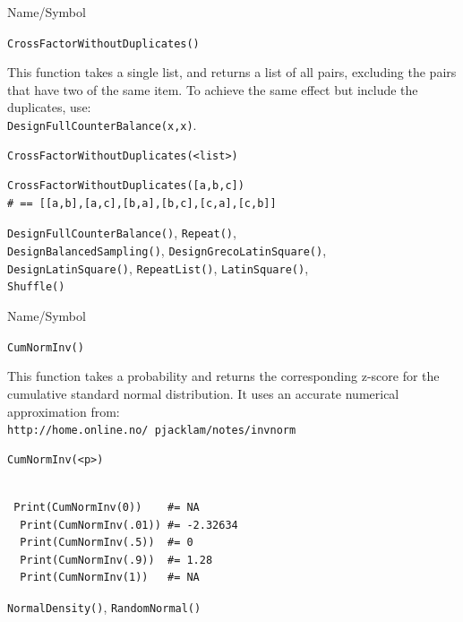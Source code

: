 \begin{desc}{Name/Symbol}
\item[Name/Symbol]  	\verb+CrossFactorWithoutDuplicates()+

\item[Description] 	This function takes a single list, and returns a list of all 
			pairs, excluding the pairs that have two of the same item. 
			To achieve the same effect but include the duplicates, use: \\
			\verb+DesignFullCounterBalance(x,x)+.

\item[Usage]
\begin{verbatim}
CrossFactorWithoutDuplicates(<list>)
\end{verbatim}

\item[Example]
\begin{verbatim}
CrossFactorWithoutDuplicates([a,b,c]) 
# == [[a,b],[a,c],[b,a],[b,c],[c,a],[c,b]]
\end{verbatim}

\item[See Also] \verb+DesignFullCounterBalance()+, \verb+Repeat()+,\\ \verb+DesignBalancedSampling()+,
 \verb+DesignGrecoLatinSquare()+,\\
  \verb+DesignLatinSquare()+,  \verb+RepeatList()+, 
  \verb+LatinSquare()+,\\ \verb+Shuffle()+
\end{desc}


\begin{desc}{Name/Symbol}
\item[Name/Symbol]  	\verb+CumNormInv()+

\item[Description] 	This function takes a probability and returns the 
  corresponding z-score for the cumulative standard normal distribution.
  It uses an accurate numerical approximation from:\\
  \texttt{http://home.online.no/~pjacklam/notes/invnorm}
\item[Usage]
\begin{verbatim}
CumNormInv(<p>)
\end{verbatim}

\item[Example]
\begin{verbatim}

 Print(CumNormInv(0))    #= NA
  Print(CumNormInv(.01)) #= -2.32634
  Print(CumNormInv(.5))  #= 0
  Print(CumNormInv(.9))  #= 1.28
  Print(CumNormInv(1))   #= NA
\end{verbatim}

\item[See Also] \verb+NormalDensity()+, \verb+RandomNormal()+
\end{desc}


